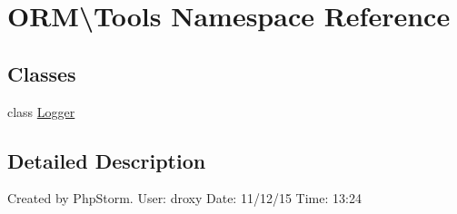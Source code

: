\hypertarget{namespaceORM_1_1Tools}{}\section{O\+RM\textbackslash{}Tools Namespace Reference}
\label{namespaceORM_1_1Tools}
\subsection*{Classes}
\begin{DoxyCompactItemize}
\item 
class \hyperlink{classORM_1_1Tools_1_1Logger}{Logger}
\end{DoxyCompactItemize}


\subsection{Detailed Description}
Created by Php\+Storm. User\+: droxy Date\+: 11/12/15 Time\+: 13\+:24 